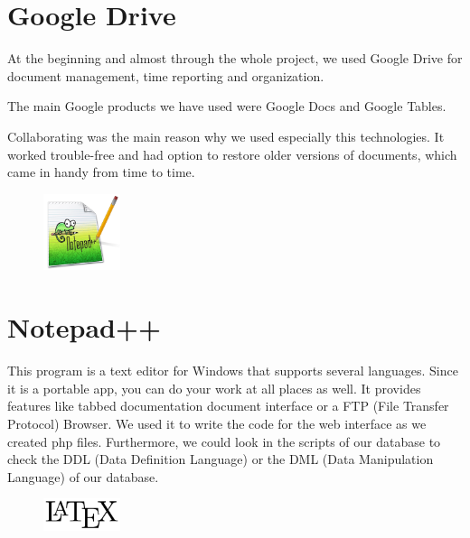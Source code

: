 \section{Google Drive}
At the beginning and almost through the whole project, we used Google Drive for document management, time reporting and organization.

The main Google products we have used were Google Docs and Google Tables.

Collaborating was the main reason why we used especially this technologies. It worked trouble-free and had option to restore older versions of documents, which came in handy from time to time.

\begin{figure}
  \begin{center}
    \includegraphics[width=0.2\textwidth] {bilder/Notepad}
  \end{center}
\end{figure}
\section{Notepad++}
This program is a text editor for Windows that supports several languages. Since it is a portable app, you can do your work at all places as well. It provides features like tabbed documentation document interface or a FTP (File Transfer Protocol) Browser. We used it to write the code for the web interface as we created \gls{php} files. Furthermore, we could look in the scripts of our database to check the DDL (Data Definition Language) or the DML (Data Manipulation Language) of our database.

\begin{figure}
  \begin{center}
    \includegraphics[width=0.2\textwidth] {bilder/LaTeX}
  \end{center}
\end{figure}
